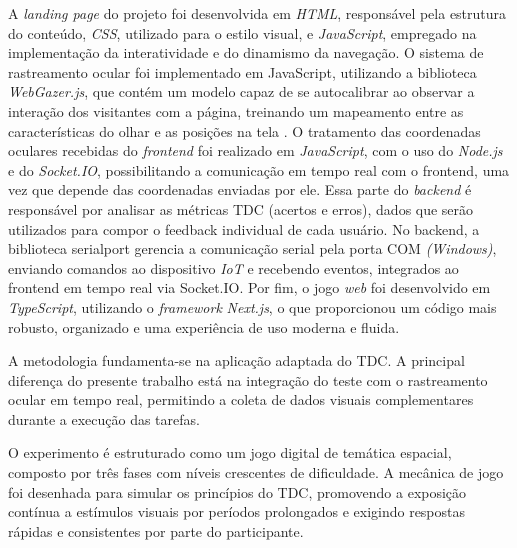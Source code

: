 A \textit{landing page} do projeto foi desenvolvida em \textit{HTML}, responsável pela estrutura do conteúdo, \textit{CSS}, utilizado para o estilo visual, e \textit{JavaScript}, empregado na implementação da interatividade e do dinamismo da navegação. O sistema de rastreamento ocular foi implementado em JavaScript, utilizando a biblioteca \textit{WebGazer.js}, que contém um modelo capaz de se autocalibrar ao observar a interação dos visitantes com a página, treinando um mapeamento entre as características do olhar e as posições na tela \cite{papoutsaki2016webgazer}. O tratamento das coordenadas oculares recebidas do \textit{frontend} foi realizado em \textit{JavaScript}, com o uso do \textit{Node.js} e do \textit{Socket.IO}, possibilitando a comunicação em tempo real com o frontend, uma vez que depende das coordenadas enviadas por ele. Essa parte do \textit{backend} é responsável por analisar as métricas TDC (acertos e erros), dados que serão utilizados para compor o feedback individual de cada usuário. No backend, a biblioteca serialport gerencia a comunicação serial pela porta COM \textit{(Windows)}, enviando comandos ao dispositivo \textit{IoT} e recebendo eventos, integrados ao frontend em tempo real via Socket.IO. Por fim, o jogo \textit{web} foi desenvolvido em \textit{TypeScript}, utilizando o \textit{framework} \textit{Next.js}, o que proporcionou um código mais robusto, organizado e uma experiência de uso moderna e fluida.

A metodologia fundamenta-se na aplicação adaptada do TDC. A principal diferença do presente trabalho está na integração do teste com o rastreamento ocular em tempo real, permitindo a coleta de dados visuais complementares durante a execução das tarefas.

O experimento é estruturado como um jogo digital de temática espacial, composto por três fases com níveis crescentes de dificuldade. A mecânica de jogo foi desenhada para simular os princípios do TDC, promovendo a exposição contínua a estímulos visuais por períodos prolongados e exigindo respostas rápidas e consistentes por parte do participante. 

